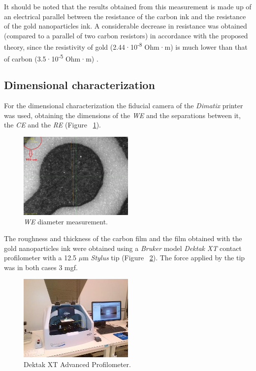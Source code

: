 It should be noted that the results obtained from this measurement is made up of an electrical parallel between the resistance of the carbon ink and the resistance of the gold nanoparticles ink. A considerable decrease in resistance was obtained (compared to a parallel of two carbon resistors) in accordance with the proposed theory, since the resistivity of gold (2.44·10\textsuperscript{-8} Ohm·m) is much lower than that of carbon (3.5·10\textsuperscript{-5} Ohm·m) \cite{Resistividad}.

\subsection{Dimensional characterization}
For the dimensional characterization the fiducial camera of the \textit{Dimatix} printer was used, obtaining the dimensions of the \emph{WE} and the separations between it, the \emph{CE} and the \emph{RE} (Figure ~\ref{fig:Figura_medicion_WE}).

\begin{figure}[H]
  \centering
    \includegraphics[width=0.5\textwidth]{Figures/Figura_medicion_WE}
  \caption{\emph{WE} diameter measurement.}
  \label{fig:Figura_medicion_WE}
\end{figure}

The roughness and thickness of the carbon film and the film obtained with the gold nanoparticles ink were obtained using a \textit{Bruker} model \textit{Dektak XT} contact profilometer with a 12.5 $\mu$m \textit{Stylus} tip (Figure ~\ref{fig:Figura_Perfilometro}). The force applied by the tip was in both cases 3 mgf.

\begin{figure}[H]
  \centering
    \includegraphics[width=0.5\textwidth]{Figures/Figura_Perfilometro}
  \caption{Dektak XT Advanced Profilometer.}
  \label{fig:Figura_Perfilometro}
\end{figure}


